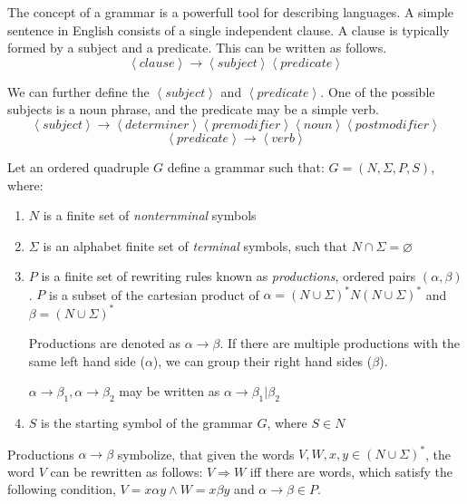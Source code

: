 The concept of a grammar is a powerfull tool for describing languages\cite[p. 52]{Linz2016Introduction}. A simple sentence in English consists of a single independent clause. A clause is typically formed by a subject and a predicate. This can be written as follows.
$$ \left< clause \right> \rightarrow \left< subject \right> \left< predicate \right> $$

We can further define the $\left< subject \right>$ and $\left< predicate \right>$. One of the possible subjects is a noun phrase, and the predicate may be a simple verb.
$$\left< subject \right> \rightarrow \left< determiner \right> \left< premodifier \right>\left< noun \right>\left< postmodifier \right>$$
$$\left< predicate \right> \rightarrow \left< verb \right>$$
\begin{definition}[Grammar]
\label{def:grammar}
\cite{Salomaa1987Formal}
Let an ordered quadruple $G$ define a grammar such that: $G=\left(N, \Sigma, P, S \right)$, where:
\begin{enumerate}
\item $N$ is a finite set of \emph{nonternminal} symbols
\item $\Sigma$ is an alphabet finite set of \emph{terminal} symbols, such that $N \cap \Sigma = \varnothing$
\item $P$ is a finite set of rewriting rules known as \emph{productions}, ordered pairs $\left( \alpha, \beta \right)$.
$P$ is a subset of the cartesian product of $\alpha = \left(N \cup \Sigma\right)^* N \left(N \cup \Sigma\right)^*$ and $\beta = \left(N \cup \Sigma\right)^*$


Productions are denoted as $\alpha \rightarrow \beta$.
If there are multiple productions with the same left hand side ($\alpha$), we can group their right hand sides ($\beta$).


$\alpha \rightarrow \beta_1, \alpha \rightarrow \beta_2$ may be written as $\alpha \rightarrow \beta_1 | \beta_2$

\item $S$ is the starting symbol of the grammar $G$, where $S \in N$
\end{enumerate}
\end{definition}

Productions $\alpha \rightarrow \beta$ symbolize, that given the words $V,W,x,y \in \left( N \cup \Sigma \right)^{*}$, the word $V$ can be rewritten as follows:
$V \Rightarrow W$ iff there are words, which satisfy the following condition, $V=x\alpha y \wedge W=x\beta y$ and $\alpha \rightarrow \beta \in P$.


